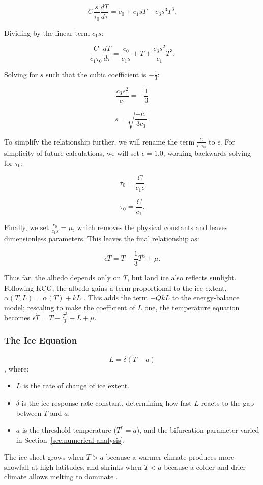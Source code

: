    \[
        C\frac{s}{\tau_0}\frac{dT}{d\tau}=c_0+c_1sT+c_3s^3T^3.
    \]

    Dividing by the linear term $c_1s$:

    \[
        \frac{C}{c_1\tau_0}\frac{dT}{d\tau}=\frac{c_0}{c_1s}+T+\frac{c_3s^2}{c_1}T^3.
    \]

    Solving for $s$ such that the cubic coefficient is $-\frac{1}{3}$:

    \[
        \frac{c_3s^2}{c_1}=-\frac{1}{3}
    \]

    \[
        s=\sqrt{\frac{-c_1}{3c_3}}.
    \]

    To simplify the relationship further, we will rename the term $\frac{C}{c_1\tau_0}$ to $\epsilon$. For simplicity of future calculations, we will set $\epsilon=1.0$, working backwards solving for $\tau_0$:

    \[
        \tau_0=\frac{C}{c_1\epsilon}
    \]

    \[
        \tau_0=\frac{C}{c_1}.
    \]

    Finally, we set $\frac{c_0}{c_1s}=\mu$, which removes the physical constants and leaves dimensionless parameters. This leaves the final relationship as:

    \[
        \epsilon\dot T= T-\frac{1}{3}T^3+\mu.
    \]
    
    
        Thus far, the albedo depends only on $T$, but land ice also reflects sunlight. Following KCG, the albedo gains a term proportional to the ice extent, $\alpha(T,L)=\alpha(T)+kL$ \parencite{plociniczakHopfBifurcation2019}. This adds the term $-QkL$ to the energy-balance model; rescaling to make the coefficient of $L$ one, the temperature equation becomes $\epsilon\dot T=T-\frac{T^3}{3}-L+\mu$.

    \subsubsection{The Ice Equation}\label{subsubsec:the-ice-equation}

    \[
        \dot L = \delta(T-a)
    \]
    \parencite{kallenFreeOscillations1979}, where:

    \begin{itemize}

        \item $\dot L$ is the rate of change of ice extent.
        \item $\delta$ is the ice response rate constant, determining how fast $L$ reacts to the gap between $T$ and $a$.
        \item $a$ is the threshold temperature ($T^*=a$), and the bifurcation parameter varied in Section~\ref{sec:numerical-analysis}.
    \end{itemize}
    	The ice sheet grows when $T>a$ because a warmer climate produces more snowfall at high latitudes, and shrinks when $T<a$ because a colder and drier climate allows melting to dominate \parencite{plociniczakHopfBifurcation2019}.
    	
